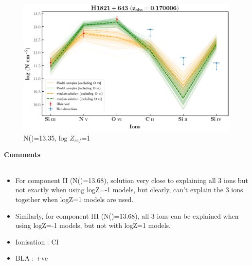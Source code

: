 \documentclass[12pt]{report}
\newcommand\ion[2]{\text{#1\,\textsc{\lowercase{#2}}}}
\begin{document}
\begin{figure}[!h]
    \centering
    \includegraphics[width=0.85\linewidth]{Ionisation-Modelling-Plots/h1821-z=0.170006-compIII_logZ=1_non_detection.png}
    \caption{N(\ion{H}{i})=13.35, log $Z_{ref}$=1}
\end{figure}


\newpage

\textbf{Comments}
\\\\
\begin{itemize}
    \item For component II (N(\ion{H}{i})=13.68), solution very close to explaining all 3 ions but not exactly when using logZ=-1 models, but clearly, can't explain the 3 ions together when logZ=1 models are used.
    \item Similarly, for component III (N(\ion{H}{i})=13.68), all 3 ions can be explained when using logZ=-1 models, but not with logZ=1 models.
    \item Ionisation : CI
    \item BLA : +ve
\end{itemize}



\newpage
\end{document}
